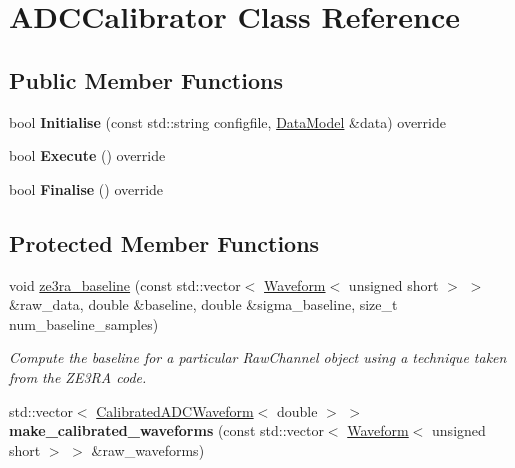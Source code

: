\hypertarget{classADCCalibrator}{
\section{ADCCalibrator Class Reference}
\label{classADCCalibrator}
}
\subsection*{Public Member Functions}
\begin{DoxyCompactItemize}
\item 
\hypertarget{classADCCalibrator_af376d025b37e060119268c1e97eae714}{
bool {\bfseries Initialise} (const std::string configfile, \hyperlink{classDataModel}{DataModel} \&data) override}
\label{classADCCalibrator_af376d025b37e060119268c1e97eae714}

\item 
\hypertarget{classADCCalibrator_ac934901bc4c27eeffe0321bc0d2bf7bb}{
bool {\bfseries Execute} () override}
\label{classADCCalibrator_ac934901bc4c27eeffe0321bc0d2bf7bb}

\item 
\hypertarget{classADCCalibrator_a91ebec325155989f4116e1097cce95f8}{
bool {\bfseries Finalise} () override}
\label{classADCCalibrator_a91ebec325155989f4116e1097cce95f8}

\end{DoxyCompactItemize}
\subsection*{Protected Member Functions}
\begin{DoxyCompactItemize}
\item 
void \hyperlink{classADCCalibrator_a94399155c9abcf28b5294b8a6e936ee4}{ze3ra\_\-baseline} (const std::vector$<$ \hyperlink{classWaveform}{Waveform}$<$ unsigned short $>$ $>$ \&raw\_\-data, double \&baseline, double \&sigma\_\-baseline, size\_\-t num\_\-baseline\_\-samples)
\begin{DoxyCompactList}\small\item\em Compute the baseline for a particular RawChannel object using a technique taken from the ZE3RA code. \item\end{DoxyCompactList}\item 
\hypertarget{classADCCalibrator_a0b32ca00704d4c1100139ec26584bc56}{
std::vector$<$ \hyperlink{classCalibratedADCWaveform}{CalibratedADCWaveform}$<$ double $>$ $>$ {\bfseries make\_\-calibrated\_\-waveforms} (const std::vector$<$ \hyperlink{classWaveform}{Waveform}$<$ unsigned short $>$ $>$ \&raw\_\-waveforms)}
\label{classADCCalibrator_a0b32ca00704d4c1100139ec26584bc56}

\end{DoxyCompactItemize}


